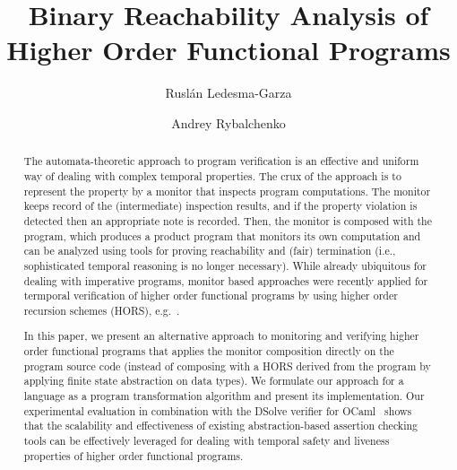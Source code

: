 \documentclass{llncs}
\begin{document}



\title{Binary Reachability Analysis of Higher Order Functional Programs}
\author{Rusl\'{a}n Ledesma-Garza \and Andrey Rybalchenko}

\maketitle

\begin{abstract}
%


\iffalse
The automata-theoretic approach to program verification is an
effective and uniform way of dealing with complex temporal properties.
The crux of the approach is to represent the property by a monitor
that inspects program computations.
The monitor keeps record of the (intermediate) inspection results, and
if the property violation is detected then an appropriate note is
recorded.
Then, the monitor is composed with the program, which produces a
product program that monitors its own computation and can be analyzed
using tools for proving reachability and (fair) termination (i.e.,
sophisticated temporal reasoning is no longer necessary).
While already ubiquitous for dealing with imperative programs, monitor
based approaches were recently applied for termporal verification of
higher order functional programs by using higher order recursion
schemes (HORS), e.g.~\cite{Ong06,Kobayashi09}.

In this paper, we present an alternative approach to monitoring and
verifying higher order functional programs that applies the monitor
composition directly on the program source code (instead of composing
with a HORS derived from the program by applying finite state
abstraction on data types).
We formulate our approach for a \miniocaml language as a program
transformation algorithm and present its implementation.
Our experimental evaluation in combination with the DSolve verifier
for OCaml~\cite{DSolveCAV} shows that the scalability and
effectiveness of existing abstraction-based assertion checking tools
can be effectively leveraged for dealing with temporal safety and
liveness properties of higher order functional programs.




\end{abstract}
\end{document}
